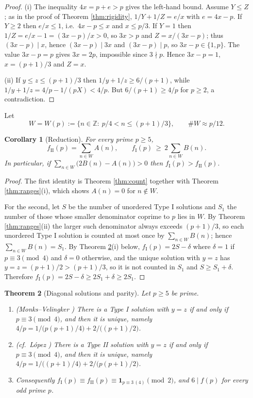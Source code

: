 \documentclass[11pt,reqno]{amsart}
\theoremstyle{plain}
\newtheorem{theorem}{Theorem}[section]
\newtheorem{corollary}[theorem]{Corollary}
\theoremstyle{definition}
\numberwithin{equation}{section}
\newcommand{\Z}{\mathbb{Z}}
\newcommand{\fI}{f_{\mathrm{I}}}
\newcommand{\fII}{f_{\mathrm{II}}}
\begin{document}
\begin{proof}
(i) The inequality $4x=p+e>p$ gives the left-hand bound. Assume $Y\le Z$; as in the
proof of Theorem \ref{thm:rigidity}, $1/Y+1/Z=e/x$ with $e=4x-p$. If $Y\ge2$ then
$e/x\le1$, i.e.\ $4x-p\le x$ and $x\le p/3$. If $Y=1$ then
$1/Z=e/x-1=(3x-p)/x>0$, so $3x>p$ and $Z=x/(3x-p)$; thus $(3x-p)\mid x$, hence
$(3x-p)\mid 3x$ and $(3x-p)\mid p$, so $3x-p\in\{1,p\}$. The value $3x-p=p$ gives
$3x=2p$, impossible since $3\nmid p$. Hence $3x-p=1$, $x=(p+1)/3$ and $Z=x$.

(ii) If $y\le z\le(p+1)/3$ then $1/y+1/z\ge6/(p+1)$, while
$1/y+1/z=4/p-1/(pX)<4/p$. But $6/(p+1)\ge4/p$ for $p\ge2$, a contradiction.
\end{proof}

Let
\begin{equation}\label{eq:window}
  W=W(p):=\{n\in\Z:\ p/4<n\le(p+1)/3\},\qquad \#W\approx p/12 .
\end{equation}

\begin{corollary}[Reduction]\label{cor:reduction}
For every prime $p\ge5$,
\[
  \fII(p)=\sum_{n\in W}A(n),\qquad \fI(p)\ \ge\ 2\sum_{n\in W}B(n).
\]
In particular, if $\sum_{n\in W}\bigl(2B(n)-A(n)\bigr)>0$ then $\fI(p)>\fII(p)$.
\end{corollary}

\begin{proof}
The first identity is Theorem \ref{thm:count} together with Theorem
\ref{thm:ranges}(i), which shows $A(n)=0$ for $n\notin W$.

For the second, let $S$ be the number of unordered Type I solutions and $S_{1}$ the
number of those whose smaller denominator coprime to $p$ lies in $W$. By Theorem
\ref{thm:ranges}(ii) the larger such denominator always exceeds $(p+1)/3$, so each
unordered Type I solution is counted at most once by $\sum_{n\in W}B(n)$; hence
$\sum_{n\in W}B(n)=S_{1}$. By Theorem \ref{thm:parity}(i) below,
$\fI(p)=2S-\delta$ where $\delta=1$ if $p\equiv3\pmod4$ and $\delta=0$ otherwise, and
the unique solution with $y=z$ has $y=z=(p+1)/2>(p+1)/3$, so it is not counted in
$S_{1}$ and $S\ge S_{1}+\delta$. Therefore
$\fI(p)=2S-\delta\ge2S_{1}+\delta\ge2S_{1}$.
\end{proof}

\begin{theorem}[Diagonal solutions and parity]\label{thm:parity}
Let $p\ge5$ be prime.
\begin{enumerate}
\item[(i)] {\rm(Monks--Velingker \cite[Thm.~2.1(h)]{MonksVelingker})} There is a Type I solution
with $y=z$ if and only if $p\equiv3\pmod4$, and then it is unique, namely
$4/p=1/\bigl(p(p+1)/4\bigr)+2/\bigl((p+1)/2\bigr)$.
\item[(ii)] {\rm(cf.\ L\'opez \cite{Lopez})} There is a Type II solution with $y=z$
if and only if $p\equiv3\pmod4$, and then it is unique, namely
$4/p=1/\bigl((p+1)/4\bigr)+2/\bigl(p(p+1)/2\bigr)$.
\item[(iii)] Consequently
$\fI(p)\equiv\fII(p)\equiv\mathbf 1_{p\equiv3\,(4)}\pmod2$, and $6\mid f(p)$ for every
odd prime $p$.
\end{enumerate}
\end{theorem}
\end{document}
